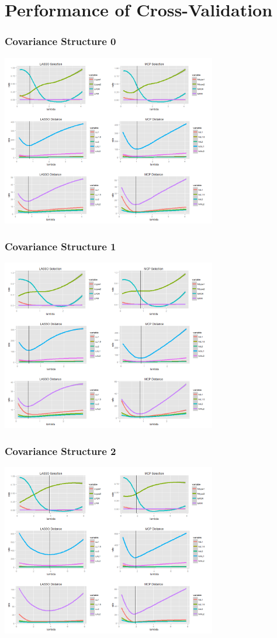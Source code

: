 \documentclass{beamer}
\begin{document}
\section{Performance of Cross-Validation}
\begin{frame}
\frametitle{Covariance Structure 0}
\begin{center}
\includegraphics[width = 3.7in]{cov0.png}
\end{center}
\end{frame}

\begin{frame}
\frametitle{Covariance Structure 1}
\begin{center}
\includegraphics[width = 3.7in]{cov1.png}
\end{center}
\end{frame}

\begin{frame}
\frametitle{Covariance Structure 2}
\begin{center}
\includegraphics[width = 3.7in]{cov2.png}
\end{center}
\end{frame}
\end{document}
